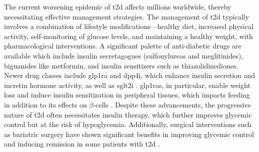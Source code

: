 
\par The current worsening epidemic of \gls{t2d} affects millions worldwide, thereby necessitating effective management strategies. The management of \gls{t2d} typically involves a combination of lifestyle modifications—healthy diet, increased physical activity, self-monitoring of glucose levels, and maintaining a healthy weight, with pharmacological interventions. A significant palette of anti-diabetic drugs are available which include insulin secretagogues (sulfonylureas and meglitinides), biguanides like metformin, 
and insulin sensitizers such as thiazolidinediones. Newer drug classes include \gls{glp1ra} and \gls{dpp4i}, which enhance insulin secretion and incretin hormone activity, as well as \gls{sglt2i} \textbf{\cite{padhi_type_2020}}. \gls{glp1ra}s, in particular, enable weight loss and induce insulin sensitization in peripheral tissues, which impacts feeding in addition to its effects on $\beta$-cells \textbf{\cite{bloemendaal_effects_2014,yaribeygi_molecular_2019}}. Despite these advancements, the progressive nature of \gls{t2d} often necessitates insulin therapy, which further improves glycemic control but at the risk of hypoglycemia. Additionally, surgical interventions such as bariatric surgery have shown significant benefits in improving glycemic control and inducing remission in some patients with \gls{t2d} \textbf{\cite{schauer_philip_r_bariatric_2014,schauer_philip_r_bariatric_2017,oppenlander_vertical_2021}}.\\

